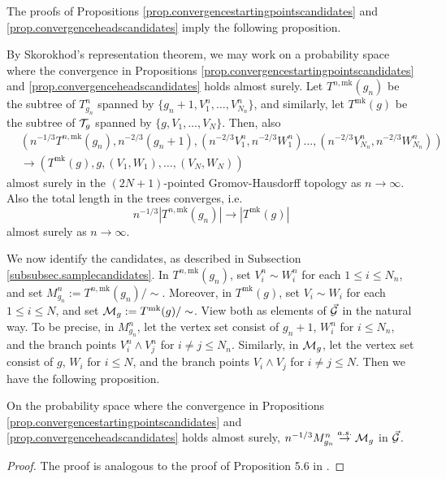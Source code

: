 The proofs of Propositions \ref{prop.convergencestartingpointscandidates} and \ref{prop.convergenceheadscandidates} imply the following proposition.
\begin{proposition}
By Skorokhod's representation theorem, we may work on a probability space where the convergence in Propositions \ref{prop.convergencestartingpointscandidates} and \ref{prop.convergenceheadscandidates} holds almost surely. Let $T^{n,\text{mk}}(g_n)$ be the subtree of $T^n_{g_n}$ spanned by $\{g_n+1,V^n_1,\dots,V^n_{N_n}\}$, and similarly, let $T^{\text{mk}}(g)$ be the subtree of ${\mathcal T}_g$ spanned by $\{g,V_1,\dots,V_N\}$. Then, also 
\begin{align*}
    &\left(n^{-1/3}T^{n,\text{mk}}(g_n), n^{-2/3}(g_n+1), \left(n^{-2/3}V^n_1,n^{-2/3}W^n_1\right) \dots, \left(n^{-2/3}V^n_{N_n}, n^{-2/3}W^n_{N_n}\right)\right)\\
    &\to \left(T^{\text{mk}}(g), g, (V_1,W_1),\dots, (V_{N},W_{N})\right)
\end{align*}
almost surely in the $(2N+1)$-pointed Gromov-Hausdorff topology as $n\to \infty$. Also the total length in the trees converges, i.e.
$$n^{-1/3}\left|T^{n,\text{mk}}(g_n)\right|\to \left| T^{\text{mk}}(g)\right|$$
almost surely as $n\to\infty$.
\end{proposition}
We now identify the candidates, as described in Subsection \ref{subsubsec.samplecandidates}. In $T^{n,\text{mk}}(g_n)$, set $V_i^n\sim W_i^n$ for each $1\leq i\leq N_n$, and set $M^n_{g_n}:=T^{n,\text{mk}}(g_n)/\sim$. Moreover, in $T^{\text{mk}}(g)$, set $V_i\sim W_i$ for each $1\leq i\leq N$, and set ${\mathcal M}_g:=T^{\text{mk}}(g)/\sim$. View both as elements of $\vec{{\mathcal G}}$ in the natural way. To be precise, in  $M^n_{g_n}$, let the vertex set consist of $g_n+1$, $W_i^n$ for $i\leq N_n$, and the branch points $V_i^n\wedge V_j^n$ for $i\neq j\leq N_n$. Similarly, in ${\mathcal M}_g$, let the vertex set consist of $g$, $W_i$ for $i\leq N$, and the branch points $V_i\wedge V_j$ for $i\neq j\leq N$. Then we have the following proposition.
\begin{proposition}
On the probability space where the convergence in Propositions \ref{prop.convergencestartingpointscandidates} and \ref{prop.convergenceheadscandidates} holds almost surely, 
$n^{-1/3}M^n_{g_n}\overset{a.s.}{\to} {\mathcal M}_g$
in $\vec{{\mathcal G}}$.
\end{proposition}
\begin{proof}
The proof is analogous to the proof of Proposition 5.6 in \cite{goldschmidtScalingLimitCritical2019}.
\end{proof}
